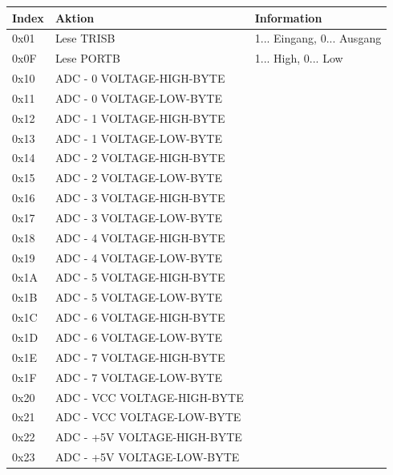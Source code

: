 \documentclass[a4paper,10pt]{article}
\begin{document}
\begin{center}
    \begin{tabular}{| l | l | l |}
    \hline
    Index 	& Aktion 			& Information \\ \hline
    0x01 	& Lese TRISB 			& 1... Eingang, 0... Ausgang \\ \hline
    0x0F 	& Lese PORTB 			& 1... High, 0... Low \\ \hline
    0x10 	& ADC - 0 VOLTAGE-HIGH-BYTE 	& \\ \hline
    0x11 	& ADC - 0 VOLTAGE-LOW-BYTE 	& \\ \hline
    0x12 	& ADC - 1 VOLTAGE-HIGH-BYTE 	& \\ \hline
    0x13 	& ADC - 1 VOLTAGE-LOW-BYTE 	& \\ \hline
    0x14 	& ADC - 2 VOLTAGE-HIGH-BYTE 	& \\ \hline
    0x15 	& ADC - 2 VOLTAGE-LOW-BYTE 	& \\ \hline
    0x16 	& ADC - 3 VOLTAGE-HIGH-BYTE 	& \\ \hline
    0x17 	& ADC - 3 VOLTAGE-LOW-BYTE 	& \\ \hline
    0x18 	& ADC - 4 VOLTAGE-HIGH-BYTE 	& \\ \hline
    0x19 	& ADC - 4 VOLTAGE-LOW-BYTE 	& \\ \hline
    0x1A 	& ADC - 5 VOLTAGE-HIGH-BYTE 	& \\ \hline
    0x1B 	& ADC - 5 VOLTAGE-LOW-BYTE 	& \\ \hline
    0x1C 	& ADC - 6 VOLTAGE-HIGH-BYTE 	& \\ \hline
    0x1D 	& ADC - 6 VOLTAGE-LOW-BYTE 	& \\ \hline
    0x1E 	& ADC - 7 VOLTAGE-HIGH-BYTE 	& \\ \hline
    0x1F 	& ADC - 7 VOLTAGE-LOW-BYTE 	& \\ \hline
    0x20 	& ADC - VCC VOLTAGE-HIGH-BYTE 	& \\ \hline
    0x21 	& ADC - VCC VOLTAGE-LOW-BYTE 	& \\ \hline
    0x22 	& ADC - +5V VOLTAGE-HIGH-BYTE 	& \\ \hline
    0x23 	& ADC - +5V VOLTAGE-LOW-BYTE 	& \\ \hline
    \end{tabular}
\end{center}
\end{document}
